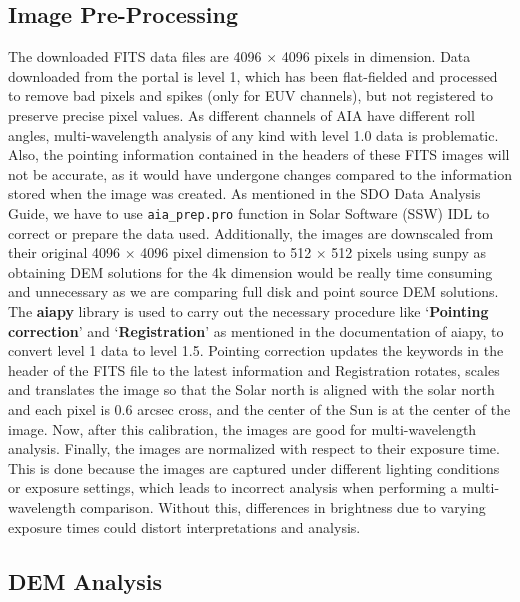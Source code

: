 \subsection{Image Pre-Processing}
\label{sec:data_pre_processing}

The downloaded FITS data files are 4096 $\times$ 4096 pixels in dimension. Data downloaded from the portal is level 1, which has been flat-fielded and processed to remove bad pixels and spikes (only for EUV channels), but not registered to preserve precise pixel values. As different channels of AIA have different roll angles, multi-wavelength analysis of any kind with level 1.0 data is problematic. Also, the pointing information contained in the headers of these FITS images will not be accurate, as it would have undergone changes compared to the information stored when the image was created. As mentioned in the SDO Data Analysis Guide, we have to use \texttt{aia\_prep.pro} function in Solar Software (SSW) IDL to correct or prepare the data used. Additionally, the images are downscaled from their original 4096 $\times$ 4096 pixel dimension to 512 $\times$ 512 pixels using sunpy as obtaining DEM solutions for the 4k dimension would be really time consuming and unnecessary as we are comparing full disk and point source DEM solutions.\\

\noindent
The \textbf{aiapy} library is used to carry out the necessary procedure like `\textbf{Pointing correction}' and `\textbf{Registration}' as mentioned in the documentation of aiapy, to convert level 1 data to level 1.5. Pointing correction updates the keywords in the header of the FITS file to the latest information and Registration rotates, scales and translates the image so that the Solar north is aligned with the solar north and each pixel is 0.6 arcsec cross, and the center of the Sun is at the center of the image. Now, after this calibration, the images are good for multi-wavelength analysis. Finally, the images are normalized with respect to their exposure time. This is done because the images are captured under different lighting conditions or exposure settings, which leads to incorrect analysis when performing a multi-wavelength comparison. Without this, differences in brightness due to varying exposure times could distort interpretations and analysis.

\subsection{DEM Analysis}
\label{sec:dem_analysis}

